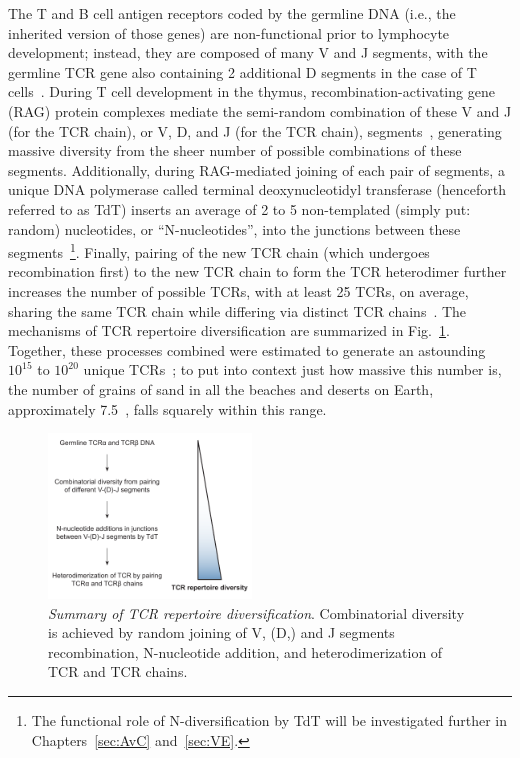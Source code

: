 The T and B cell antigen receptors coded by the germline DNA (i.e., the inherited version of those genes) are non-functional prior to lymphocyte development; instead, they are composed of many V and J segments, with the germline TCR\textbeta{} gene also containing 2 additional D segments in the case of T cells~\cite{litman2010origins,schatz2011recombination}. During T cell development in the thymus, recombination-activating gene (RAG) protein complexes mediate the semi-random combination of these V and J (for the TCR\textalpha{} chain), or V, D, and J (for the TCR\textbeta{} chain), segments~\cite{schatz2011recombination,robins2010overlap}, generating massive diversity from the sheer number of possible combinations of these segments. Additionally, during RAG-mediated joining of each pair of segments, a unique DNA polymerase called terminal deoxynucleotidyl transferase (henceforth referred to as TdT) inserts an average of 2 to 5 non-templated (simply put: random) nucleotides, or ``N-nucleotides'', into the junctions between these segments~\cite{schatz2011recombination,mickelsen1999modulation}\footnote{The functional role of N-diversification by TdT will be investigated further in Chapters~\ref{sec:AvC} and~\ref{sec:VE}.}. Finally, pairing of the new TCR\textbeta{} chain (which undergoes recombination first) to the new TCR\textalpha{} chain to form the TCR heterodimer further increases the number of possible TCRs, with at least 25 TCRs, on average, sharing the same TCR\textbeta{} chain while differing via distinct TCR\textalpha{} chains~\cite{arstila1999direct}. The mechanisms of TCR repertoire diversification are summarized in Fig.~\ref{fig:intro_TCRdiversity}. Together, these processes combined were estimated to generate an astounding $10^{15}$ to $10^{20}$ unique TCRs~\cite{davis1988t,zarnitsyna2013estimating}; to put into context just how massive this number is, the number of grains of sand in all the beaches and deserts on Earth, approximately 7.5~\cite{blatner2012spectrums}, falls squarely within this range.

\begin{figure}[ht]
    \centering
    \includegraphics[width=0.48\textwidth]{Figures/intro/fig2_TCRdiversity.pdf}
    \caption[Summary of TCR repertoire diversification]{%
    \textit{Summary of TCR repertoire diversification}. %
    Combinatorial diversity is achieved by random joining of V, (D,) and J segments recombination, N-nucleotide addition, and heterodimerization of TCR\textalpha{} and TCR\textbeta{} chains.}
    \label{fig:intro_TCRdiversity}
\end{figure}

